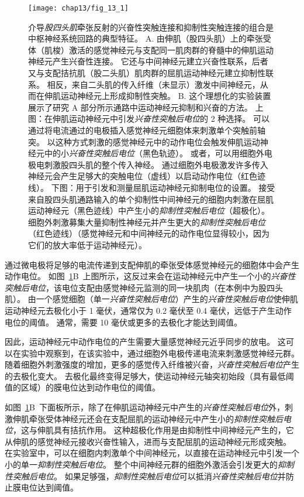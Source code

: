 \begin{figure}[htbp]
	\centering
	\texttt{[image: chap13/fig\_13\_1]}
	\caption{介导\textit{股四头肌}牵张反射的兴奋性突触连接和抑制性突触连接的组合是中枢神经系统回路的典型特征。
		A. 由伸肌（股四头肌）上的牵张受体（肌梭）激活的感觉神经元与支配同一肌肉群的脊髓中的伸肌运动神经元产生兴奋性连接。
		它还与中间神经元建立兴奋性联系，后者又与支配拮抗肌（股二头肌）肌肉群的屈肌运动神经元建立抑制性联系。
		相反，来自二头肌的传入纤维（未显示）激发中间神经元，从而在伸肌运动神经元上形成抑制性突触。
		B. 这个理想化的实验装置展示了研究 A 部分所示通路中运动神经元抑制和兴奋的方法。
		上图：在伸肌运动神经元中引发\textit{兴奋性突触后电位}的 2 种选择。
		可以通过将电流通过的电极插入感觉神经元细胞体来刺激单个突触前轴突。
		以这种方式刺激的感觉神经元中的动作电位会触发伸肌运动神经元中的小\textit{兴奋性突触后电位}（黑色轨迹）。
		或者，可以用细胞外电极电刺激股四头肌的整个传入神经。
		通过细胞外电极激发许多传入神经元会产生足够大的突触电位（虚线）以启动动作电位（红色迹线）。
		下图：用于引发和测量屈肌运动神经元抑制电位的设置。
		接受来自股四头肌通路输入的单个抑制性中间神经元的细胞内刺激在屈肌运动神经元（黑色迹线）中产生小的\textit{抑制性突触后电位}（超极化）。
		细胞外刺激募集大量抑制性神经元并产生更大的\textit{抑制性突触后电位}（红色迹线）（感觉神经元和中间神经元的动作电位显得较小，因为它们的放大率低于运动神经元）。}
	\label{fig:13_1}
\end{figure}


通过微电极将足够的电流传递到支配伸肌的牵张受体感觉神经元的细胞体中会产生动作电位。
如图~\ref{fig:13_1}B~上图所示，这反过来会在运动神经元中产生一个小的\textit{兴奋性突触后电位}，该电位支配由感觉神经元监测的同一块肌肉（在本例中为股四头肌）。
由一个感觉细胞（单一\textit{兴奋性突触后电位}）产生的\textit{兴奋性突触后电位}使伸肌运动神经元去极化小于 1 毫伏，通常仅为 0.2 毫伏至 0.4 毫伏，远低于产生动作电位的阈值。
通常，需要 10 毫伏或更多的去极化才能达到阈值。


因此，运动神经元中动作电位的产生需要大量感觉神经元近乎同步的放电。
这可以在实验中观察到，在该实验中，通过细胞外电极传递电流来刺激感觉神经元群。
随着细胞外刺激强度的增加，更多的感觉传入纤维被兴奋，\textit{兴奋性突触后电位}产生的去极化变大。
去极化最终变得足够大，使运动神经元轴突初始段（具有最低阈值的区域）的膜电位达到动作电位的阈值。


如图~\ref{fig:13_1}B~下面板所示，除了在伸肌运动神经元中产生的\textit{兴奋性突触后电位}外，刺激伸肌牵张受体神经元还会在支配屈肌的运动神经元中产生小的\textit{抑制性突触后电位}，这与伸肌具有拮抗作用。
这种超极化作用是由抑制性中间神经元产生的，它从伸肌的感觉神经元接收兴奋性输入，进而与支配屈肌的运动神经元形成突触。
在实验室中，可以在细胞内刺激单个中间神经元，以直接在运动神经元中引发一个小的单一\textit{抑制性突触后电位}。
整个中间神经元群的细胞外激活会引发更大的\textit{抑制性突触后电位}。
如果足够强，\textit{抑制性突触后电位}可以抵消\textit{兴奋性突触后电位}并防止膜电位达到阈值。



